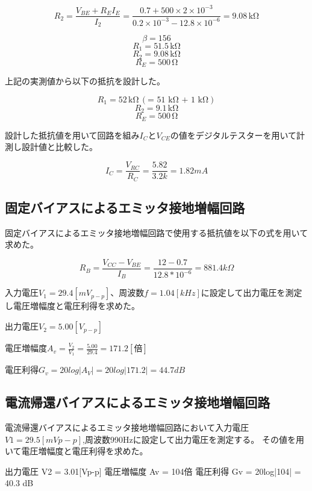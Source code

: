\documentclass[a4paper,11pt,xelatex,ja=standard]{bxjsarticle}
\begin{document}
        \[ R_2 = \frac{V_{BE} + R_E I_E}{I_2} = \frac{0.7 + 500 \times 2 \times 10^{-3}}{0.2 \times 10^{-3} - 12.8 \times 10^{-6}} = 9.08 \, \text{kΩ} \]


        \[ \beta = 156 \]   \[ R_1 = 51.5 \, \text{kΩ} \]   \[ R_2 = 9.08 \, \text{kΩ} \]   \[ R_E = 500 \, \text{Ω} \]

        上記の実測値から以下の抵抗を設計した。


        \[ R_1 = 52 \, \text{kΩ} \, (\text{= 51 kΩ + 1 kΩ}) \] \[ R_2 = 9.1 \, \text{kΩ} \] \[ R_E = 500 \, \text{Ω} \]

        設計した抵抗値を用いて回路を組み$I_C$と$V_{CE}$の値をデジタルテスターを用いて計測し設計値と比較した。

        $$
        I_C = \frac{V_{RC}}{R_C} = \frac{5.82}{3.2k} = 1.82 mA
        $$

    \subsection{固定バイアスによるエミッタ接地増幅回路}
        固定バイアスによるエミッタ接地増幅回路で使用する抵抗値を以下の式を用いて求めた。

        $$
            R_B = \frac{V_{CC} - V_{BE}}{I_B} = \frac{12-0.7}{12.8 * 10^{-6}} = 881.4 k \Omega
        $$

        入力電圧$V_1 = 29.4[mV_{p-p}]$、周波数$f=1.04[kHz]$に設定して出力電圧を測定し電圧増幅度と電圧利得を求めた。
        
        出力電圧$V_2 = 5.00 [V_{p-p}]$

        電圧増幅度$A_v = \frac{V_2}{V_1} = \frac{5.00}{29.4} = 171.2[倍]$

        電圧利得$G_v = 20log|A_V| = 20log|171.2| = 44.7dB$ 

    \subsection{電流帰還バイアスによるエミッタ接地増幅回路}
        電流帰還バイアスによるエミッタ接地増幅回路において入力電圧$V1=29.5[mVp-p]$,周波数990Hzに設定して出力電圧を測定する。
        その値を用いて電圧増幅度と電圧利得を求めた。

        出力電圧 V2 = 3.01[Vp-p]
        電圧増幅度 Av = 104倍
        電圧利得 Gv = 20log|104| = 40.3 dB

\end{document}
